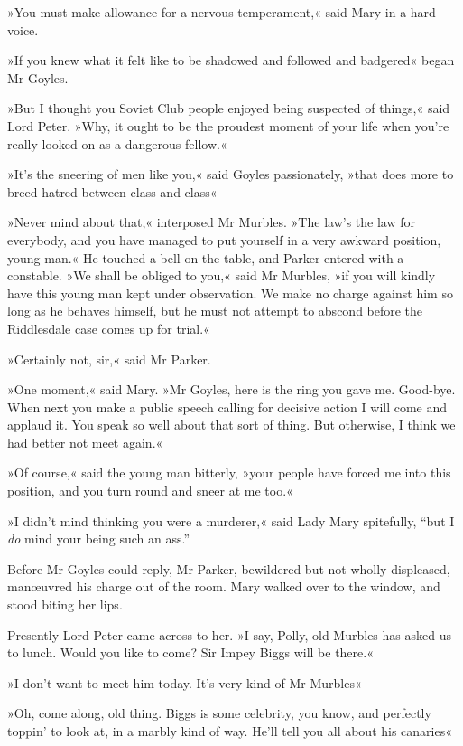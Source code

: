 »You must make allowance for a nervous temperament,« said Mary in a hard voice.

»If you knew what it felt like to be shadowed and followed and badgered\longdash« began Mr Goyles.

»But I thought you Soviet Club people enjoyed being suspected of things,« said Lord Peter. »Why, it ought to be the proudest moment of your life when you're really looked on as a dangerous fellow.«

»It's the sneering of men like you,« said Goyles passionately, »that does more to breed hatred between class and class\longdash«

»Never mind about that,« interposed Mr Murbles. »The law's the law for everybody, and you have managed to put yourself in a very awkward position, young man.« He touched a bell on the table, and Parker entered with a constable. »We shall be obliged to you,« said Mr Murbles, »if you will kindly have this young man kept under observation. We make no charge against him so long as he behaves himself, but he must not attempt to abscond before the Riddlesdale case comes up for trial.«

»Certainly not, sir,« said Mr Parker.

»One moment,« said Mary. »Mr Goyles, here is the ring you gave me.  Good-bye. When next you make a public speech calling for decisive action I will come and applaud it. You speak so well about that sort of thing. But otherwise, I think we had better not meet again.«

»Of course,« said the young man bitterly, »your people have forced me into this position, and you turn round and sneer at me too.«

»I didn't mind thinking you were a murderer,« said Lady Mary spitefully, \enquote{but I \textit{do} mind your being such an ass.}

Before Mr Goyles could reply, Mr Parker, bewildered but not wholly displeased, manœuvred his charge out of the room. Mary walked over to the window, and stood biting her lips.

Presently Lord Peter came across to her. »I say, Polly, old Murbles has asked us to lunch. Would you like to come? Sir Impey Biggs will be there.«

»I don't want to meet him today. It's very kind of Mr Murbles\longdash«

»Oh, come along, old thing. Biggs is some celebrity, you know, and perfectly toppin' to look at, in a marbly kind of way. He'll tell you all about his canaries\longdash«

